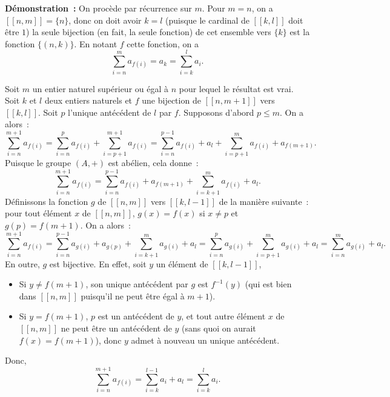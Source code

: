 \medskip

\noindent\textbf{Démonstration :} 
    On procède par récurrence sur $m$. 
    Pour $m = n$, on a $[\![n, m]\!] = \lbrace n \rbrace$, donc on doit avoir $k = l$ (puisque le cardinal de $[\![k, l]\!]$ doit être $1$) la seule bijection (en fait, la seule fonction) de cet ensemble vers $\lbrace k \rbrace$ est la fonction $\lbrace (n, k) \rbrace$. 
    En notant $f$ cette fonction, on a 
    \begin{equation*}
        \sum_{i=n}^m a_{f(i)} = a_k = \sum_{i=k}^l a_i.
    \end{equation*}
    
    Soit $m$ un entier naturel supérieur ou égal à $n$ pour lequel le résultat est vrai.
    Soit $k$ et $l$ deux entiers naturels et $f$ une bijection de $[\![n, m+1]\!]$ vers $[\![k, l]\!]$.
    Soit $p$ l'unique antécédent de $l$ par $f$.
    Supposons d'abord $p \leq m$.
    On a alors : 
    \begin{equation*}
        \sum_{i=n}^{m+1} a_{f(i)}
        = \sum_{i=n}^p a_{f(i)} + \sum_{i=p+1}^{m+1} a_{f(i)}
        = \sum_{i=n}^{p-1} a_{f(i)} + a_l + \sum_{i=p+1}^m a_{f(i)} + a_{f(m+1)}.
    \end{equation*}
    Puisque le groupe $(A, +)$ est abélien, cela donne : 
    \begin{equation*}
        \sum_{i=n}^{m+1} a_{f(i)}
        = \sum_{i=n}^{p-1} a_{f(i)} + a_{f(m+1)} + \sum_{i=k+1}^m a_{f(i)} + a_l .
    \end{equation*}
    Définissons la fonction $g$ de $[\![n, m]\!]$ vers $[\![k, l-1]\!]$ de la manière suivante : pour tout élément $x$ de $[\![n, m]\!]$, $g(x) = f(x)$ si $x \neq p$ et $g(p) = f(m+1)$. 
    On a alors : 
    \begin{equation*}
        \sum_{i=n}^{m+1} a_{f(i)}
        = \sum_{i=n}^{p-1} a_{g(i)} + a_{g(p)} + \sum_{i=k+1}^m a_{g(i)} + a_l
        = \sum_{i=n}^p a_{g(i)} + \sum_{i=p+1}^m a_{g(i)} + a_l 
        = \sum_{i=n}^m a_{g(i)} + a_l .
    \end{equation*}
    En outre, $g$ est bijective. 
    En effet, soit $y$ un élément de $[\![k, l-1]\!]$, 
    \begin{itemize}[nosep]
        \item Si $y \neq f(m+1)$, son unique antécédent par $g$ est $f^{-1}(y)$ (qui est bien dans $[\![n, m]\!]$ puisqu'il ne peut être égal à $m+1$).
        \item Si $y = f(m+1)$, $p$ est un antécédent de $y$, et tout autre élément $x$ de $[\![n, m]\!]$ ne peut être un antécédent de $y$ (sans quoi on aurait $f(x) = f(m+1)$), donc $y$ admet à nouveau un unique antécédent.
    \end{itemize}
    Donc, 
    \begin{equation*}
        \sum_{i=n}^{m+1} a_{f(i)}
        = \sum_{i=k}^{l-1} a_i + a_l 
        = \sum_{i=k}^l a_i .
    \end{equation*}

